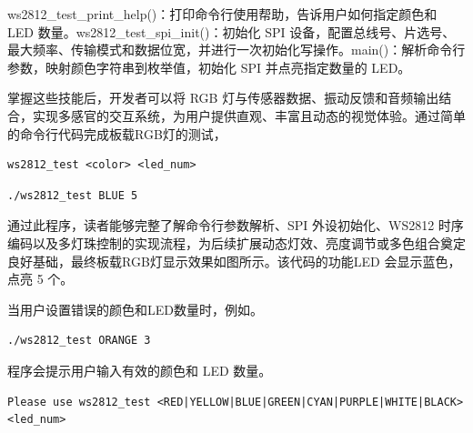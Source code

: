 ws2812_test_print_help()：打印命令行使用帮助，告诉用户如何指定颜色和 LED 数量。ws2812_test_spi_init()：初始化 SPI 设备，配置总线号、片选号、最大频率、传输模式和数据位宽，并进行一次初始化写操作。main()：解析命令行参数，映射颜色字符串到枚举值，初始化 SPI 并点亮指定数量的 LED。

掌握这些技能后，开发者可以将 RGB 灯与传感器数据、振动反馈和音频输出结合，实现多感官的交互系统，为用户提供直观、丰富且动态的视觉体验。通过简单的命令行代码完成板载RGB灯的测试，
\begin{lstlisting}[numbers=none]
ws2812_test <color> <led_num>
\end{lstlisting}

\begin{lstlisting}[numbers=none]
./ws2812_test BLUE 5
\end{lstlisting}
通过此程序，读者能够完整了解命令行参数解析、SPI 外设初始化、WS2812 时序编码以及多灯珠控制的实现流程，为后续扩展动态灯效、亮度调节或多色组合奠定良好基础，最终板载RGB灯显示效果如图所示。该代码的功能LED 会显示蓝色，点亮 5 个。

当用户设置错误的颜色和LED数量时，例如。
\begin{lstlisting}[numbers=none]
./ws2812_test ORANGE 3
\end{lstlisting}

程序会提示用户输入有效的颜色和 LED 数量。
\begin{lstlisting}[numbers=none]
Please use ws2812_test <RED|YELLOW|BLUE|GREEN|CYAN|PURPLE|WHITE|BLACK> <led_num>
\end{lstlisting}